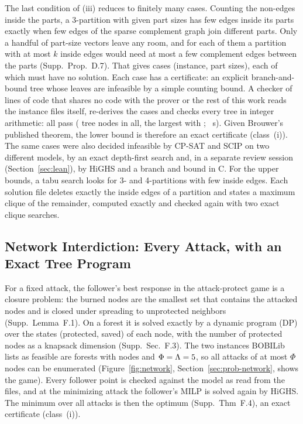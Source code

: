 \documentclass[]{spie}  %
\theoremstyle{plain}
\newcommand{\supp}[1]{Supp.\ Sec.~#1}
\newcommand{\cls}[1]{class~(#1)}             %
\begin{document}
The last condition of (iii) reduces to finitely many cases. Counting the non-edges inside the
parts, a 3-partition with given part sizes has few edges inside its parts exactly when few
edges of the sparse complement graph join different parts. Only a handful of part-size vectors
leave any room, and for each of them a partition with at most $k$ inside edges would need at most
a few complement edges between the parts (Supp.\ Prop.~D.7). That gives \NumCliquePartCases{}
cases (instance, part sizes), each of which must have no solution. Each case has a certificate: an
explicit branch-and-bound tree whose leaves are infeasible by a simple counting bound. A checker
of \CliqueCheckerLines{} lines of code that shares no code with the prover or the rest of this work reads
the instance files itself, re-derives the cases and checks every tree in integer arithmetic: all
\CliqueCertCases{} pass (\CliqueCertNodes{} tree nodes in all, the largest with
\CliqueCertMaxNodes{}; \CliqueCertSeconds{}~s). Given Brouwer's published theorem, the lower
bound \CliqueOptNine{} is therefore an exact certificate (\cls{i}). The same cases were also decided infeasible
by \mbox{CP-SAT}\cite{perron2026cpsat} and SCIP\cite{hojny2025scip,maher2016pyscipopt} on two different
models, by an exact depth-first search and, in a separate review session
(Section~\ref{sec:lean}), by HiGHS and a branch and bound in C. For the upper bounds, a tabu search looks for 3- and 4-partitions with few inside
edges. Each solution file deletes exactly the inside edges of a partition and states a maximum
clique of the remainder, computed exactly and checked again with two exact clique
searches.\cite{bron1973algorithm,tomita2006worst,carraghan1990exact}

\subsection{Network Interdiction: Every Attack, with an Exact Tree Program}\label{sec:network}

For a fixed attack, the follower's best response in the attack-protect game is a closure problem:
the burned nodes are the smallest set that contains the attacked nodes and is closed under
spreading to unprotected neighbors (Supp.\ Lemma~F.1). On a forest it is solved exactly by a
dynamic program (DP) over the states (protected, saved) of each node, with the number of
protected nodes as a knapsack dimension (\supp{F.3}). The two instances BOBILib lists as
feasible are forests with \NetworkNodes{} nodes and $\Phi=\Lambda=5$, so all
\NetworkAttacks{} attacks of at most $\Phi$ nodes can be enumerated (Figure~\ref{fig:network},
Section~\ref{sec:prob-network}, shows the game).
Every follower point is checked against the model as read from the files, and at the minimizing
attack the follower's MILP is solved again by HiGHS. The minimum over all attacks is then the
optimum (Supp.\ Thm~F.4), an exact certificate (\cls{i}).
\end{document}
